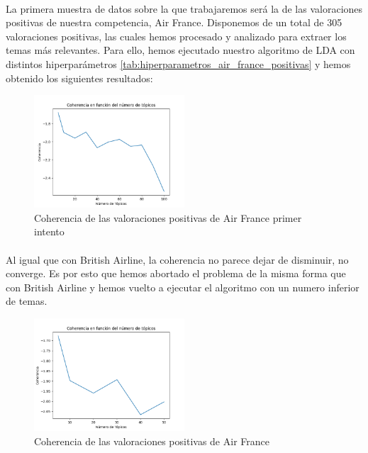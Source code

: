\documentclass{report}
\begin{document}
                    \paragraph*{}{
                        La primera muestra de datos sobre la que trabajaremos será la de las valoraciones positivas de nuestra competencia, Air France.
                        Disponemos de un total de 305 valoraciones positivas, las cuales hemos procesado y analizado para extraer los temas más relevantes.
                        Para ello, hemos ejecutado nuestro algoritmo de LDA con distintos hiperparámetros \ref{tab:hiperparametros_air_france_positivas} y hemos obtenido los siguientes resultados:
                    }
                    \begin{figure}[H]
                        \centering
                        \includegraphics[width=0.5\textwidth]{./img/air_france_positivas1.png}
                        \caption{Coherencia de las valoraciones positivas de Air France primer intento}
                    \end{figure}
                    \paragraph*{}{
                        Al igual que con British Airline, la coherencia no parece dejar de disminuir, no converge.
                        Es por esto que hemos abortado el problema de la misma forma que con British Airline y hemos vuelto a ejecutar el algoritmo con un numero inferior de temas.
                    }
                    \begin{figure}[H]
                        \centering
                        \includegraphics[width=0.5\textwidth]{./img/air_france_positivas2.png}
                        \caption{Coherencia de las valoraciones positivas de Air France}
                    \end{figure}
\end{document}

